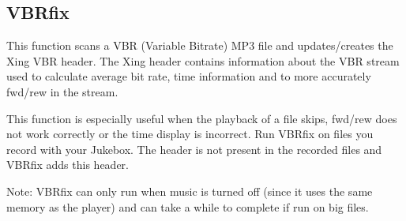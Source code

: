 \subsection{VBRfix}
This function scans a VBR (Variable Bitrate)
MP3 file and updates/creates the Xing VBR header. The Xing header
contains information about the VBR stream used to calculate average bit
rate, time information and to more accurately fwd/rew in the stream.

This function is especially useful when the playback of a file skips,
fwd/rew does not work correctly or the time display is incorrect. Run
VBRfix on files you record with your Jukebox. The header is not present
in the recorded files and VBRfix adds this header.

Note: VBRfix can only run when music is
turned off (since it uses the same memory as the player) and can take a
while to complete if run on big files.

